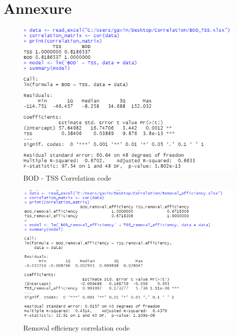 \newpage
\section*{\centering Annexure}




\begin{figure}[H]
\centering
\includegraphics[width=1\linewidth]{annexure/BOD_TSS_correlation.png}
\caption{BOD - TSS Correlation code}
\label{fig:BOD_TSS_Correlation}
\end{figure}

\begin{figure}[H]
\centering
\includegraphics[width=1\linewidth]{annexure/RE_coreelation.png}
\caption{Removal efficiency correlation code}
\label{fig:RE_Correlation}
\end{figure}